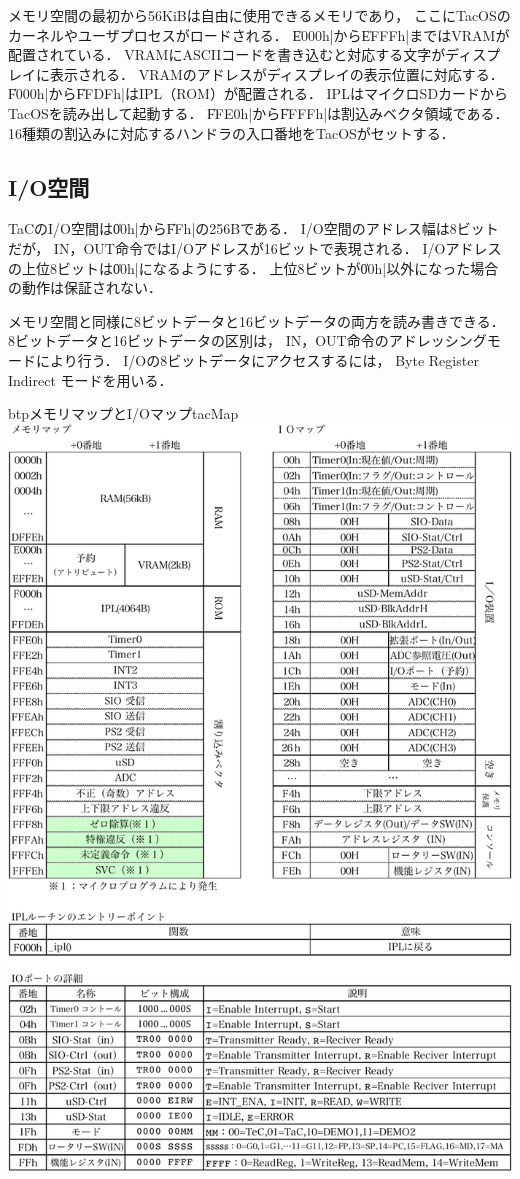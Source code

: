 メモリ空間の最初から56KiBは自由に使用できるメモリであり，
ここにTacOSのカーネルやユーザプロセスがロードされる．
\|E000h|から\|EFFFh|まではVRAMが配置されている．
VRAMにASCIIコードを書き込むと対応する文字がディスプレイに表示される．
VRAMのアドレスがディスプレイの表示位置に対応する．
\|F000h|から\|FFDFh|はIPL（ROM）が配置される．
IPLはマイクロSDカードからTacOSを読み出して起動する．
\|FFE0h|から\|FFFFh|は割込みベクタ領域である．
16種類の割込みに対応するハンドラの入口番地をTacOSがセットする．

\subsection{I/O空間}
TaCのI/O空間は\|00h|から\|FFh|の256Bである．
I/O空間のアドレス幅は8ビットだが，
IN，OUT命令ではI/Oアドレスが16ビットで表現される．
I/Oアドレスの上位8ビットは\|00h|になるようにする．
上位8ビットが\|00h|以外になった場合の動作は保証されない．

メモリ空間と同様に8ビットデータと16ビットデータの両方を読み書きできる．
8ビットデータと16ビットデータの区別は，
IN，OUT命令のアドレッシングモードにより行う．
I/Oの8ビットデータにアクセスするには，
Byte Register Indirect モードを用いる．

\begin{myfig}{btp}{メモリマップとI/Oマップ}{tacMap}
  \includegraphics[scale=0.8]{Tbl/TaC7a-instruction-p4-crop.pdf}
\end{myfig}
